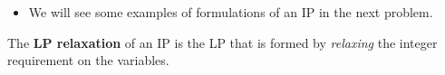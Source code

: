 \documentclass[11pt]{article}
\theoremstyle{definition}
\newcommand{\answerbox}[3]{%
  \fbox{%
    \begin{minipage}[#1]{#2}
      \hfill\vspace{#3}
    \end{minipage}
  }
}
\newcommand{\wordbox}{\answerbox{c}{1.2in}{.7cm}}
\begin{document}
\begin{itemize}
\item  We will see some examples of formulations of an IP in the next problem.
\end{itemize}

\bigskip
\begin{tcolorbox}
The \textbf{LP relaxation} of an IP is the LP that is formed by \emph{relaxing} the integer requirement on the variables.
\end{tcolorbox}

%
%
%
\end{document}
